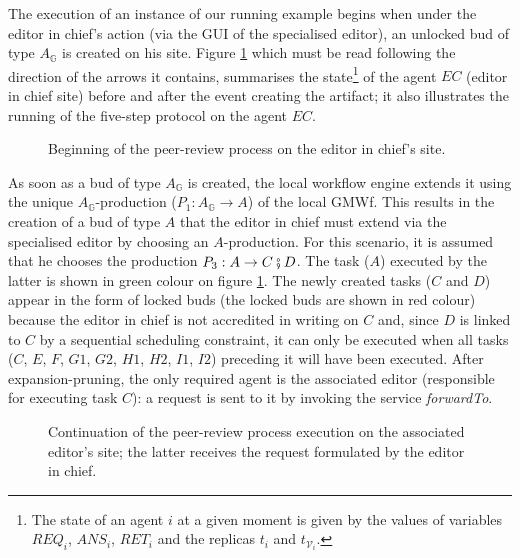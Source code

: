 \label{chap3:sec:choreograpghy-illustration}

The execution of an instance of our running example begins when under the editor in chief's action (via the GUI of the specialised editor), an unlocked bud of type $A_{\mathbb{G}}$ is created on his site.
Figure \ref{chap3:fig:execution-figure-1} which must be read following the direction of the arrows it contains, summarises the state\footnote{The state of an agent $i$ at a given moment is given by the values of variables $REQ_i$, $ANS_i$, $RET_i$ and the replicas $t_i$ and $t_{\mathcal{V}_i}$.} of the agent $EC$ (editor in chief site) before and after the event creating the artifact; it also illustrates the running of the five-step protocol on the agent $EC$.
\begin{figure}[ht!]
	\noindent
	\caption{Beginning of the peer-review process on the editor in chief's site.}
	\label{chap3:fig:execution-figure-1}
\end{figure}

As soon as a bud of type $A_{\mathbb{G}}$ is created, the local workflow engine extends it using the unique $A_{\mathbb{G}}$-production ($P_{1}:A_{\mathbb{G}} \rightarrow A$) of the local GMWf. This results in the creation of a bud of type $A$ that the editor in chief must extend via the specialised editor by choosing an $A$-production.
For this scenario, it is assumed that he chooses the production $P_{3}:A \rightarrow C \fatsemi D$.
The task ($A$) executed by the latter is shown in green colour on figure \ref{chap3:fig:execution-figure-1}.
The newly created tasks ($C$ and $D$) appear in the form of locked buds (the locked buds are shown in red colour) because the editor in chief is not accredited in writing on $C$ and, since $D$ is linked to $C$ by a sequential scheduling constraint, it can only be executed when all tasks ($C$, $E$, $F$, $G1$, $G2$, $H1$, $H2$, $I1$, $I2$) preceding it will have been executed.
After expansion-pruning, the only required agent is the associated editor (responsible for executing task $C$): a request is sent to it by invoking the service \textit{forwardTo}.
\begin{figure}[ht!]
	\noindent
	\caption{Continuation of the peer-review process execution on the associated editor's site; the latter receives the request formulated by the editor in chief.}
	\label{chap3:fig:execution-figure-2}
\end{figure}

